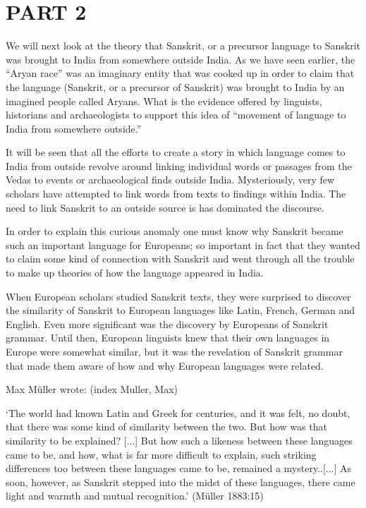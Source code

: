\section*{PART 2}

We will next look at the theory that Sanskrit, or a precursor language to Sanskrit was brought to India from somewhere outside India. As we have seen earlier, the “Aryan race” was an imaginary entity that was cooked up in order to claim that the language (Sanskrit, or a precursor of Sanskrit) was brought to India by an imagined people called Aryans. What is the evidence offered by linguists, historians and archaeologists to support this idea of “movement of language to India from somewhere outside.”

It will be seen that all the efforts to create a story in which language comes to India from outside revolve around linking individual words or passages from the Vedas to events or archaeological finds outside India. Mysteriously, very few scholars have attempted to link words from texts to findings within India. The need to link Sanskrit to an outside source is has dominated the discourse.

In order to explain this curious anomaly one must know why Sanskrit became such an important language for Europeans; so important in fact that they wanted to claim some kind of connection with Sanskrit and went through all the trouble to make up theories of how the language appeared in India.

When European scholars studied Sanskrit texts, they were surprised to discover the similarity of Sanskrit to European languages like Latin, French, German and English. Even more significant was the discovery by Europeans of Sanskrit grammar. Until then, European linguists knew that their own languages in Europe were somewhat similar, but it was the revelation of Sanskrit grammar that made them aware of how and why European languages were related.

Max Müller wrote: (index Muller, Max)

\begin{myquote}
‘The world had known Latin and Greek for centuries, and it was felt, no doubt, that there was some kind of similarity between the two. But how was that similarity to be explained? [...] But how such a likeness between these languages came to be, and how, what is far more difficult to explain, such striking differences too between these languages came to be, remained a mystery..[...] As soon, however, as Sanskrit stepped into the midst of these languages, there came light and warmth and mutual recognition.’ (Müller 1883:15)
\end{myquote}

